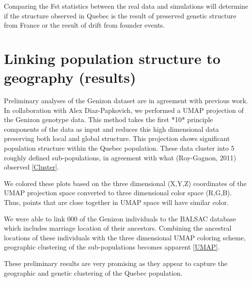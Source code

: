 \documentclass[
11pt, %
oneside, %
english, %
doublespacing, %
headsepline, %
]{MastersDoctoralThesis} %
\begin{document}
Comparing the Fst statistics between the real data and simulations will determine if the structure observed in Quebec is the result of preserved genetic structure from France or the result of drift from founder events.

\section{Linking population structure to geography (results)}
Preliminary analyses of the Genizon dataset are in agreement with previous work.
In collaboration with Alex Diaz-Papkovich, we performed a UMAP projection of the Genizon genotype data.
This method takes the first *10* principle components of the data as input and reduces this high dimensional data preserving both local and global structure.
This projection shows significant population structure within the Quebec population. 
These data cluster into 5 roughly defined sub-populations, in agreement with what (Roy-Gagnon, 2011) observed \ref{Cluster}. 


We colored these plots based on the three dimensional (X,Y,Z) coordinates of the UMAP projection space converted to three dimensional color space (R,G,B).
Thus, points that are close together in UMAP space will have similar color.

We were able to link 000 of the Genizon individuals to the BALSAC database which includes marriage location of their ancestors.
Combining the ancestral locations of these individuals with the three dimensional UMAP coloring scheme, geographic clustering of the sub-populations becomes apparent \ref{UMAP}.  

These preliminary results are very promising as they appear to capture the geographic and genetic clustering of the Quebec population.
\end{document}
